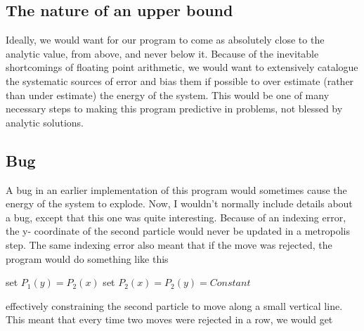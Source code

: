 \documentclass[11pt,a4paper,titlepage]{article}
\begin{document}
\subsection{The nature of an upper bound}
Ideally, we would want for our program to come as absolutely close to the analytic value, from above, and never below it. Because of the inevitable shortcomings of floating point arithmetic, we would want to extensively catalogue the systematic sources of error and bias them if possible to over estimate (rather than under estimate) the energy of the system. This would be one of many necessary steps to making this program predictive in problems, not blessed by analytic solutions.
\subsection{Bug}
A bug in an earlier implementation of this program would sometimes cause the energy of the system to explode. Now, I wouldn't normally include details about a bug, except that this one was quite interesting. Because of an indexing error, the y- coordinate of the second particle would never be updated in a metropolis step. The same indexing error also meant that if the move was rejected, the program would do something like this

\begin{algorithm}[H]
\SetAlgoLined
set $P_1(y) = P_2(x)$\;
set $P_2(x) = P_2(y) = Constant$\;
\end{algorithm}
effectively constraining the second particle to move along a small vertical line.
This meant that every time two moves were rejected in a row, we would get
\end{document}
